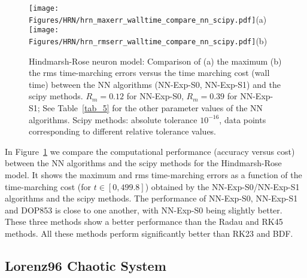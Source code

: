 \begin{figure}
  \centerline{
    \texttt{[image: Figures/HRN/hrn\_maxerr\_walltime\_compare\_nn\_scipy.pdf]}(a)
    \texttt{[image: Figures/HRN/hrn\_rmserr\_walltime\_compare\_nn\_scipy.pdf]}(b)
  }
  \caption{Hindmarsh-Rose neuron model:
    Comparison of (a) the maximum (b) the rms time-marching errors
    versus the time marching
    cost (wall time) between the NN algorithms (NN-Exp-S0, NN-Exp-S1)
    and the scipy methods.
    $R_m=0.12$ for NN-Exp-S0, $R_m=0.39$ for NN-Exp-S1; See Table~\ref{tab_5} for
    the other parameter values of the NN algorithms.
    Scipy methods:
    absolute tolerance $10^{-16}$,
    data points corresponding to different relative tolerance values.
  }
  \label{fg_25}
\end{figure}

In Figure~\ref{fg_25} we compare the computational performance (accuracy versus cost)
between the NN algorithms and the scipy methods for the Hindmarsh-Rose model.
It shows the maximum and rms time-marching errors
as a function of the time-marching cost (for $t\in[0,499.8]$) obtained
by the NN-Exp-S0/NN-Exp-S1 algorithms and the scipy methods.
The performance of NN-Exp-S0, NN-Exp-S1 and DOP853 is close to one another,
with NN-Exp-S0 being slightly better.
These three methods show a better performance than the Radau and RK45 methods.
All these methods perform significantly better than RK23 and BDF.


\subsection{Lorenz96 Chaotic System}
\label{sec_lorenz96}

